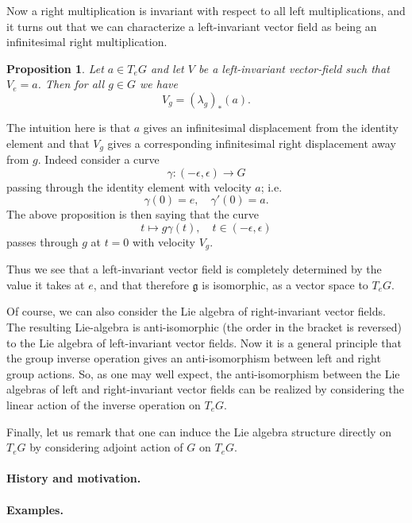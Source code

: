 \documentclass[12pt]{article}
\newcommand{\fg}{\mathfrak{g}}
\newcommand{\lact}{\lambda}
\newtheorem{proposition}{Proposition}
\begin{document}
Now a right multiplication is invariant with respect to all
left multiplications, and it turns out that we can characterize a
left-invariant vector field as being an infinitesimal right multiplication.
\begin{proposition}
  Let $a\in T_eG$ and let $V$ be a left-invariant vector-field such that
  $V_e = a$.  Then for all $g\in G$ we have
  $$V_g = (\lact_g)_*(a).$$
\end{proposition}
The intuition here is that $a$
gives an infinitesimal displacement from the identity element and that
$V_g$ gives a corresponding infinitesimal right displacement away from $g$.
Indeed consider a curve 
$$\gamma \colon (-\epsilon,\epsilon) \to G$$
passing through the identity element with velocity $a$; i.e.
$$\gamma(0) = e,\quad \gamma'(0) = a.$$
The above proposition is then
saying that the curve 
$$t\mapsto g\gamma(t),\quad t\in(-\epsilon,\epsilon)$$
passes through
$g$ at $t=0$ with velocity $V_g$.

Thus we see that a left-invariant vector field is completely
determined by the value it takes at $e$, and that therefore $\fg$ is
isomorphic, as a vector space to $T_eG$.

Of course, we can also consider the Lie algebra of right-invariant
vector fields.  The resulting Lie-algebra is anti-isomorphic (the
order in the bracket is reversed) to the Lie algebra of left-invariant
vector fields.  Now it is a general principle that the group inverse
operation gives an anti-isomorphism between left and right group
actions.  So, as one may well expect, the anti-isomorphism between the
Lie algebras of left and right-invariant vector fields can be realized
by considering the linear action of the inverse operation on $T_e G$.

Finally, let us remark that one can induce the Lie algebra structure
directly on $T_e G$ by considering adjoint action of $G$ on $T_eG$. 

\paragraph{History and motivation.}

\paragraph{Examples.}
\end{document}
